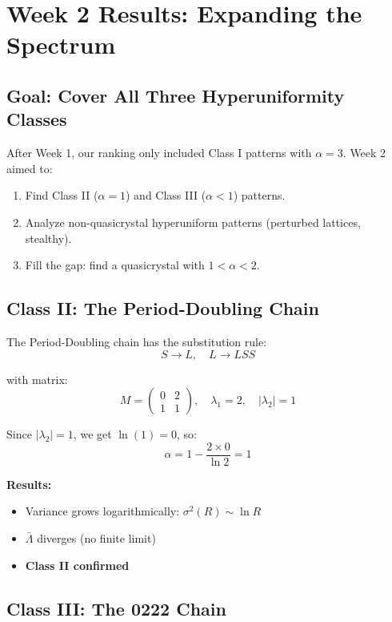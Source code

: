 \documentclass[11pt,letterpaper]{article}
\begin{document}
\section{Week 2 Results: Expanding the Spectrum}

\subsection{Goal: Cover All Three Hyperuniformity Classes}

After Week 1, our ranking only included Class I patterns with $\alpha = 3$. Week 2 aimed to:
\begin{enumerate}
    \item Find Class II ($\alpha = 1$) and Class III ($\alpha < 1$) patterns.
    \item Analyze non-quasicrystal hyperuniform patterns (perturbed lattices, stealthy).
    \item Fill the gap: find a quasicrystal with $1 < \alpha < 2$.
\end{enumerate}

\subsection{Class II: The Period-Doubling Chain}

The Period-Doubling chain has the substitution rule:
\[
S \to L, \quad L \to LSS
\]

with matrix:
\[
M = \begin{pmatrix} 0 & 2 \\ 1 & 1 \end{pmatrix}, \quad \lambda_1 = 2, \quad |\lambda_2| = 1
\]

Since $|\lambda_2| = 1$, we get $\ln(1) = 0$, so:
\[
\alpha = 1 - \frac{2 \times 0}{\ln 2} = 1
\]

\textbf{Results:}
\begin{itemize}
    \item Variance grows logarithmically: $\sigma^2(R) \sim \ln R$
    \item $\bar{\Lambda}$ diverges (no finite limit)
    \item \textbf{Class II confirmed}
\end{itemize}

\subsection{Class III: The 0222 Chain}
\end{document}
